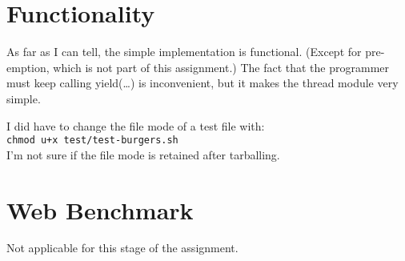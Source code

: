 \documentclass[a4paper, 12pt]{report}
\begin{document}
\section{Functionality}
    As far as I can tell, the simple implementation is functional.  
    (Except for pre-emption, which is not part of this assignment.)
    The fact that the programmer must keep calling yield(\ldots{}) is inconvenient, 
        but it makes the thread module very simple.  
    
    I did have to change the file mode of a test file with: \\
    \texttt{chmod u+x test/test-burgers.sh} \\
    I'm not sure if the file mode is retained after tarballing.
        
\section{Web Benchmark}
    Not applicable for this stage of the assignment.
    
\end{document}
